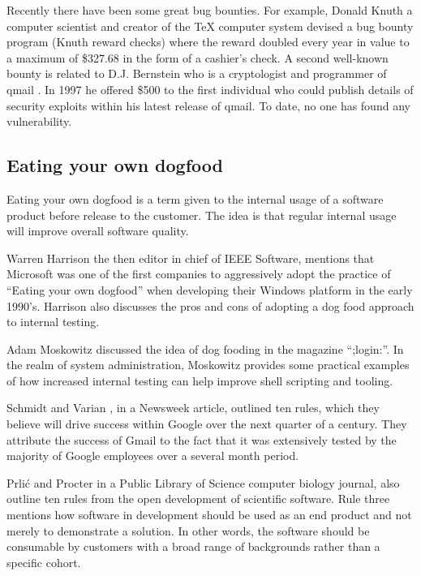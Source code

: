 Recently there have been some great bug bounties. For example, Donald Knuth a computer scientist and creator of the TeX computer system \cite{Knuth2015} devised a bug bounty program (Knuth reward checks) where the reward doubled every year in value to a maximum of  \$327.68 in the form of a cashier's check. A second well-known bounty is related to D.J. Bernstein who is a cryptologist and programmer of qmail \cite{Bernstein2015}. In 1997 he offered \$500 to the first individual who could publish details of security exploits within his latest release of qmail. To date, no one has found any vulnerability.

\subsection{Eating your own dogfood}

Eating your own dogfood is a term given to the internal usage of a software product before release to the customer. The idea is that regular internal usage will improve overall software quality. 

Warren Harrison \cite{harrison2006eating} the then editor in chief of IEEE Software, mentions that Microsoft was one of the first companies to aggressively adopt the practice of ``Eating your own dogfood'' when developing their Windows platform in the early 1990's. Harrison also discusses the pros and cons of adopting a dog food approach to internal testing.

Adam Moskowitz \cite{moskowitz2003eat} discussed the idea of dog fooding in the magazine ``;login:''.  In the realm of system administration, Moskowitz provides some practical examples of how increased internal testing can help improve shell scripting and tooling.

Schmidt and Varian \cite{schmidt2005google}, in a Newsweek article, outlined ten rules, which they believe will drive success within Google over the next quarter of a century. They attribute the success of Gmail to the fact that it was extensively tested by the majority of Google employees over a several month period.

Prli\'c and Procter \cite{prlic2012ten} in a Public Library of Science computer biology journal, also outline ten rules from the open development of scientific software. Rule three mentions how software in development should be used as an end product and not merely to demonstrate a solution. In other words, the software should be consumable by customers with a broad range of backgrounds rather than a specific cohort.

